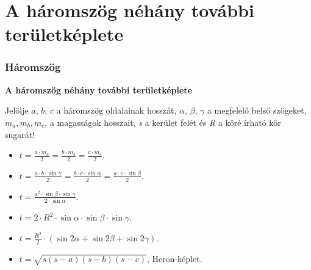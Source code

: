 \documentclass[11pt]{beamer}
\begin{document}
\section{\textbf{A háromszög néhány további területképlete}}
\begin{frame}[<+->]
\frametitle{Háromszög}
\begin{block}{\textbf{A háromszög néhány további területképlete}}
\begin{list}{}{\leftmargin=1.5em}
\item Jelölje $a$, $b$, $c$ a háromszög oldalainak hosszát, $\alpha$, $\beta$, $\gamma$ a megfelelő belső szögeket, $m_a, m_b, m_c$, a magasságok hosszait, \textit{s} a kerület felét és \textit{R} a köré írható kör sugarát!
\end{list}
\begin{itemize}
\item $ t = \frac{a \cdot m_a}{2} = \frac{b \cdot m_b}{2} = \frac{c \cdot m_c}{2}$.
\item $ t = \frac{a \cdot b \cdot \sin\!\gamma} {2} = \frac{b \cdot c \cdot \sin\!\alpha} {2} = \frac{a \cdot c \cdot \sin\!\beta} {2}$.
\item $t = \frac{a^2 \cdot \sin\!\beta \cdot \sin\!\gamma}{2 \cdot \sin\!\alpha}$.
\item $t = 2 \cdot R^2 \cdot \sin\!\alpha \cdot \sin\!\beta \cdot \sin\!\gamma$.
\item $t = \frac{R^2}{2} \cdot (\sin\!2\alpha + \sin\!2\beta + \sin\!2\gamma)$.
\item $t = \sqrt{s(s-a)(s-b)(s-c)}$, Heron-képlet.
\end{itemize}
\end{block}
\end{frame}
\end{document}
